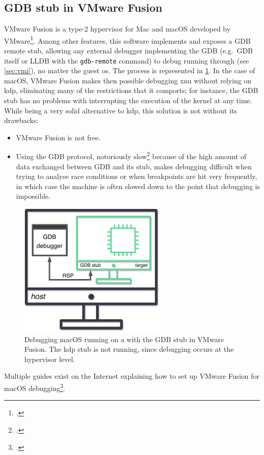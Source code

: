 \subsection{GDB stub in VMware Fusion}\label{sec:stubvmfusion}
VMware Fusion is a type-2 hypervisor for Mac and macOS developed by VMware\footcite{VMware}. Among other features, this software implements and exposes a GDB remote stub, allowing any external debugger implementing the GDB  (e.g.\ GDB itself or LLDB with the \lstinline{gdb-remote} command) to debug running  through  (see \cref{sec:vmi}), no matter the guest \gls{os}. The process is represented in \cref{fig:fusiondbg}. In the case of macOS, VMware Fusion makes then possible debugging \gls{xnu} without relying on \gls{kdp}, eliminating many of the restrictions that it comports; for instance, the GDB stub has no problems with interrupting the execution of the kernel at any time. While being a very solid alternative to \gls{kdp}, this solution is not without its drawbacks:
\begin{itemize}
    \item VMware Fusion is not free.
    \item Using the GDB protocol, notoriously slow\footcite{Couffin2016Winbagility,sally2010pro,GDBSlow2,GDBSlow3} because of the high amount of data exchanged between GDB and its stub, makes debugging difficult when trying to analyse race conditions or when breakpoints are hit very frequently, in which case the machine is often slowed down to the point that debugging is impossible.
\end{itemize}

\begin{figure}
    \centering
    \caption{Debugging macOS running on a  with the GDB stub in VMware Fusion. The \gls{kdp} stub is not running, since debugging occurs at the hypervisor level.}\label{fig:fusiondbg}
    \includegraphics[width=70mm]{figures/debugging-fusion-debugging.pdf}
\end{figure}

Multiple guides exist on the Internet explaining how to set up VMware Fusion for macOS debugging\footcites{MacOSDebug9,MacOSDebug11,MacOSDebug12}.
